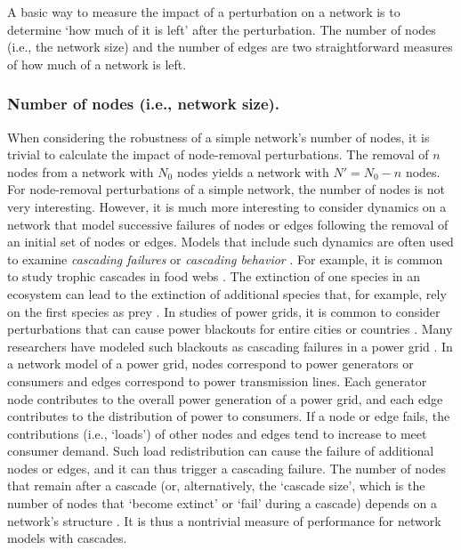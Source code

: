 \documentclass{comnet-mod}
\begin{document}
A basic way to measure the impact of a perturbation on a network is to determine `how much of it is left' after the perturbation. The number of nodes (i.e., the network size) and the number of edges are two straightforward measures of how much of a network is left.


\subsubsection{Number of nodes (i.e., network size).}


When considering the robustness of a simple network's number of nodes, it is trivial to calculate the impact of node-removal perturbations. The removal of $n$ nodes from a network with $N_0$ nodes yields a network with $N' = N_0 - n$ nodes. For node-removal perturbations of a simple network, the number of nodes is not very interesting. However, it is much more interesting to consider dynamics on a network that model successive failures of nodes or edges following the removal of an initial set of nodes or edges. Models that include such dynamics are often used to examine \textit{cascading failures} or \textit{cascading behavior} \cite{Crucitti2004a, Karimi2013, Heath2014, Porter2016, Borge-Holthoefer2013}. For example, it is common to study {trophic cascades} in food webs \cite{Dunne2002, Dunne2004, Vieira2015, Dattilo2016, Baehner2017, Lance2017}. The extinction of one species in an ecosystem can lead to the extinction of additional species that, for example, rely on the first species as prey \cite{Dunne2002}. In studies of power grids, it is common to consider perturbations that can cause power blackouts for entire cities or countries \cite{Cuadra2015}. 
Many researchers have modeled such blackouts as  {cascading failures} in a power grid \cite{Cuadra2015, Chen2017, Galias2017, Liu2017}. In a network model of a power grid, nodes correspond to power generators or consumers and edges correspond to power transmission lines. Each generator node contributes to the overall power generation of a power grid, and each edge contributes to the distribution of power to consumers. If a node or edge fails, the contributions (i.e., `loads') of other nodes and edges tend to increase to meet consumer demand. Such load redistribution can cause the failure of additional nodes or edges, and it can thus trigger a cascading failure. The number of nodes that remain after a cascade (or, alternatively, the `cascade size', which is the number of nodes that `become extinct' or `fail' during a cascade) depends on a network's structure \cite{Cuadra2015}. It is thus a nontrivial measure of performance for network models with cascades.
\end{document}
